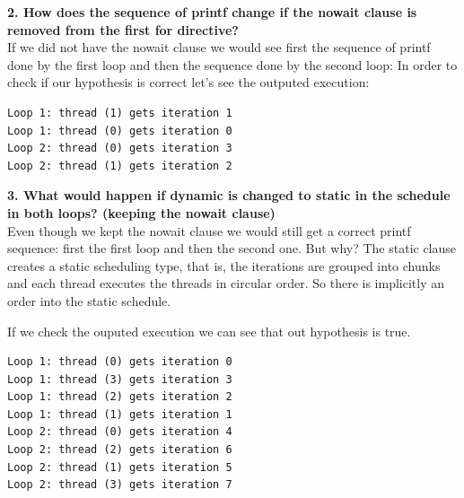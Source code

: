 \documentclass[12]{article}
\begin{document}
\textbf{2. How does the sequence of printf change if the nowait clause is removed from the first for directive?}
\\
If we did not have the nowait clause we would see first the sequence of printf done by the first loop and then the sequence done by the second loop:
In order to check if our hypothesis is correct let's see the outputed execution: 
\\
\begin{lstlisting}[frame=single]
Loop 1: thread (1) gets iteration 1
Loop 1: thread (0) gets iteration 0
Loop 2: thread (0) gets iteration 3
Loop 2: thread (1) gets iteration 2
\end{lstlisting} 
\textbf{3. What would happen if dynamic is changed to static in the schedule in both loops? (keeping the nowait clause)}
\\
 Even though we kept the nowait clause we would still get a correct printf sequence: first the first loop and then the second one. But why? The static clause creates a static scheduling type, that is, the iterations are grouped into chunks and each thread executes the threads in circular order. So there is implicitly an order into the static schedule. 

If we check the ouputed execution we can see that out hypothesis is true. 
\\
\begin{lstlisting}[frame=single]
Loop 1: thread (0) gets iteration 0
Loop 1: thread (3) gets iteration 3
Loop 1: thread (2) gets iteration 2
Loop 1: thread (1) gets iteration 1
Loop 2: thread (0) gets iteration 4
Loop 2: thread (2) gets iteration 6
Loop 2: thread (1) gets iteration 5
Loop 2: thread (3) gets iteration 7
\end{lstlisting}
\end{document}
